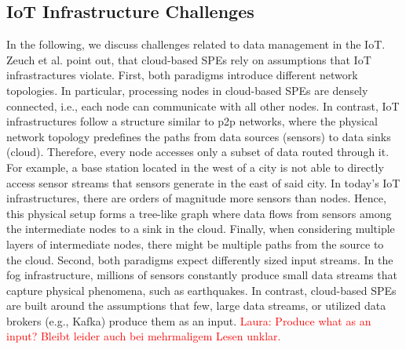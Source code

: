 \subsection{IoT Infrastructure Challenges}
In the following, we discuss challenges related to data management in the IoT. 
Zeuch et al. \cite{nes} point out, that cloud-based SPEs rely on assumptions that IoT infrastractures violate.
First, both paradigms introduce different network topologies.
In particular, processing nodes in cloud-based SPEs are densely connected, i.e., each node can communicate with all other nodes.
In contrast, IoT infrastructures follow a structure similar to p2p networks, where the physical network topology predefines the paths from data sources (sensors) to data sinks (cloud). 
Therefore, every node accesses only a subset of data routed through it. 
For example, a base station located in the west of a city is not able to directly access sensor streams that sensors generate in the east of said city. 
In today's IoT infrastructures, there are orders of magnitude more sensors than nodes. Hence, this physical setup forms a tree-like graph where data flows from sensors among the intermediate nodes to a sink in the cloud.
Finally, when considering multiple layers of intermediate nodes, there might be multiple paths from the source to the cloud. 
Second, both paradigms expect differently sized input streams.
In the fog infrastructure, millions of sensors constantly produce small data streams that capture physical phenomena, such as earthquakes. 
In contrast, cloud-based SPEs are built around the assumptions that few, large data streams, or utilized data brokers (e.g., Kafka) produce them as an input. \textcolor{red}{Laura: Produce what as an input? Bleibt leider auch bei mehrmaligem Lesen unklar.}
% 
